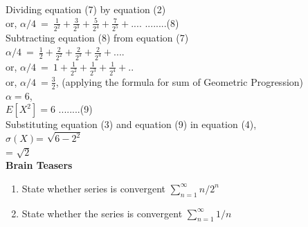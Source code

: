 \documentclass{llncs}
\begin{document}
Dividing equation (7) by equation (2)\\

 or, $\alpha/4\ =\ \frac{1}{2^2} + \frac{3}{2^3} + \frac{5}{2^4} + \frac{7}{2^5} + .... $  \hspace{5mm} ........(8)\\
 
 Subtracting equation (8) from equation (7)\\
 
$\alpha/4\ =\ \frac{1}{2} + \frac{2}{2^2} + \frac{2}{2^3} + \frac{2}{2^4} + .... $\\

or, $\alpha/4\ =\ 1 + \frac{1}{2^2} + \frac{1}{2^3} + \frac{1}{2^4} + .. $\\ 

or, $\alpha/4\ =\frac{3}{2}$, (applying the formula for sum of Geometric Progression)\\

$\alpha = 6$, \\

$E[X^2]=6$	\hspace{5mm} ........(9)\\

Substituting equation (3) and equation (9) in equation (4), \\

$\sigma(X)$=  $ \sqrt{6- 2 ^ 2} $\\

= $\sqrt{2}$\\

	
\textbf{Brain Teasers}
\begin{enumerate}
\item State whether series is convergent $\sum_{n=1}^{\infty} n/2^{n} $
\item State whether the series is convergent $\sum_{n=1}^{\infty} 1/n$ 
\end{enumerate}
\end{document}
